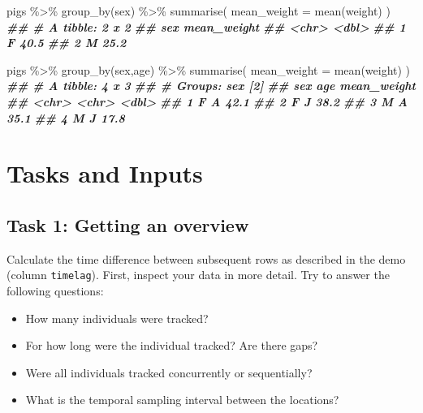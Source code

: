 \documentclass[
]{book}
\newenvironment{Shaded}{\begin{snugshade}}{\end{snugshade}}
\newcommand{\AttributeTok}[1]{\textcolor[rgb]{0.77,0.63,0.00}{#1}}
\newcommand{\DocumentationTok}[1]{\textcolor[rgb]{0.56,0.35,0.01}{\textbf{\textit{#1}}}}
\newcommand{\FunctionTok}[1]{\textcolor[rgb]{0.00,0.00,0.00}{#1}}
\newcommand{\NormalTok}[1]{#1}
\newcommand{\SpecialCharTok}[1]{\textcolor[rgb]{0.00,0.00,0.00}{#1}}
\providecommand{\tightlist}{%
  \setlength{\itemsep}{0pt}\setlength{\parskip}{0pt}}
\begin{document}
\begin{Shaded}
\begin{Highlighting}[]
\NormalTok{pigs }\SpecialCharTok{\%\textgreater{}\%}
  \FunctionTok{group\_by}\NormalTok{(sex) }\SpecialCharTok{\%\textgreater{}\%}
  \FunctionTok{summarise}\NormalTok{(         }
    \AttributeTok{mean\_weight =} \FunctionTok{mean}\NormalTok{(weight)}
\NormalTok{  )}
\DocumentationTok{\#\# \# A tibble: 2 x 2}
\DocumentationTok{\#\#   sex   mean\_weight}
\DocumentationTok{\#\#   \textless{}chr\textgreater{}       \textless{}dbl\textgreater{}}
\DocumentationTok{\#\# 1 F            40.5}
\DocumentationTok{\#\# 2 M            25.2}

\NormalTok{pigs }\SpecialCharTok{\%\textgreater{}\%}
  \FunctionTok{group\_by}\NormalTok{(sex,age) }\SpecialCharTok{\%\textgreater{}\%}
  \FunctionTok{summarise}\NormalTok{(         }
    \AttributeTok{mean\_weight =} \FunctionTok{mean}\NormalTok{(weight)}
\NormalTok{  )}
\DocumentationTok{\#\# \# A tibble: 4 x 3}
\DocumentationTok{\#\# \# Groups:   sex [2]}
\DocumentationTok{\#\#   sex   age   mean\_weight}
\DocumentationTok{\#\#   \textless{}chr\textgreater{} \textless{}chr\textgreater{}       \textless{}dbl\textgreater{}}
\DocumentationTok{\#\# 1 F     A            42.1}
\DocumentationTok{\#\# 2 F     J            38.2}
\DocumentationTok{\#\# 3 M     A            35.1}
\DocumentationTok{\#\# 4 M     J            17.8}
\end{Highlighting}
\end{Shaded}

\hypertarget{tasks-and-inputs-1}{%
\section{Tasks and Inputs}\label{tasks-and-inputs-1}}

\hypertarget{task-1-getting-an-overview}{%
\subsection{Task 1: Getting an overview}\label{task-1-getting-an-overview}}

Calculate the time difference between subsequent rows as described in the demo (column \texttt{timelag}).
First, inspect your data in more detail. Try to answer the following questions:

\begin{itemize}
\tightlist
\item
  How many individuals were tracked?
\item
  For how long were the individual tracked? Are there gaps?
\item
  Were all individuals tracked concurrently or sequentially?
\item
  What is the temporal sampling interval between the locations?
\end{itemize}
\end{document}
